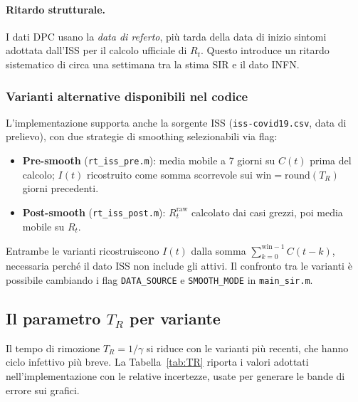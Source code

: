 \documentclass[12pt, a4paper]{article}
\begin{document}
\paragraph{Ritardo strutturale.}
I dati DPC usano la \emph{data di referto}, più tarda della data di inizio sintomi
adottata dall'ISS per il calcolo ufficiale di $R_t$.
Questo introduce un ritardo sistematico di circa una settimana tra la stima SIR e il dato INFN.

\subsubsection*{Varianti alternative disponibili nel codice}

L'implementazione supporta anche la sorgente ISS (\texttt{iss-covid19.csv}, data di prelievo),
con due strategie di smoothing selezionabili via flag:

\begin{itemize}
    \item \textbf{Pre-smooth} (\texttt{rt\_iss\_pre.m}): media mobile a 7 giorni su $C(t)$
          prima del calcolo; $I(t)$ ricostruito come somma scorrevole sui $\text{win} = \text{round}(T_R)$
          giorni precedenti.
    \item \textbf{Post-smooth} (\texttt{rt\_iss\_post.m}): $R_t^{\text{raw}}$
          calcolato dai casi grezzi, poi media mobile su $R_t$.
\end{itemize}

Entrambe le varianti ricostruiscono $I(t)$ dalla somma $\sum_{k=0}^{\text{win}-1} C(t-k)$,
necessaria perché il dato ISS non include gli attivi.
Il confronto tra le varianti è possibile cambiando i flag \texttt{DATA\_SOURCE} e
\texttt{SMOOTH\_MODE} in \texttt{main\_sir.m}.

\subsection{Il parametro \texorpdfstring{$T_R$}{TR} per variante}
\label{sub:TR}

Il tempo di rimozione $T_R = 1/\gamma$ si riduce con le varianti più recenti,
che hanno ciclo infettivo più breve.
La Tabella~\ref{tab:TR} riporta i valori adottati nell'implementazione con le relative
incertezze, usate per generare le bande di errore sui grafici.
\end{document}
